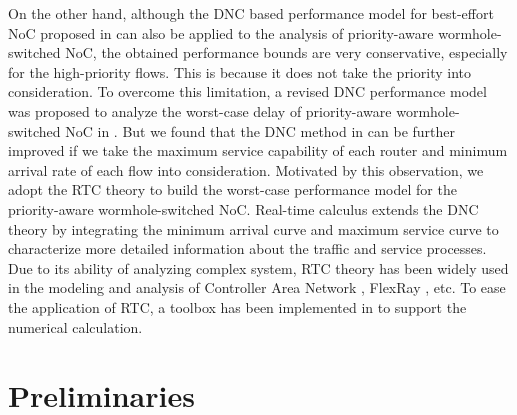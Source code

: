 \documentclass[preprint]{elsarticle}
\begin{document}
On the other hand, although the DNC based performance model for best-effort NoC proposed in \cite{qian2009analysis} can also be applied to the analysis of priority-aware wormhole-switched NoC, the obtained performance bounds are very conservative, especially for the high-priority flows. This is because it does not take the priority into consideration. To overcome this limitation, a revised DNC performance model was proposed to analyze the worst-case delay of priority-aware wormhole-switched NoC in \cite{Qian489900}. But we found that the DNC method in \cite{Qian489900} can be further improved if we take the maximum service capability of each router and minimum arrival rate of each flow into consideration. Motivated by this observation, we adopt the RTC theory \cite{1253607} to build the worst-case performance model for the priority-aware wormhole-switched NoC. Real-time calculus extends the DNC theory \cite{Boudec2001Network} by integrating the minimum arrival curve and maximum service curve to characterize more detailed information about the traffic and service processes. Due to its ability of analyzing complex system, RTC theory has been widely used in the modeling and analysis of Controller Area Network \cite{4617308}, FlexRay \cite{Hagiescu:2007:PAF:1278480.1278554}, etc. To ease the application of RTC, a toolbox has been implemented in \cite{rtc} to support the numerical calculation.

\section{Preliminaries}\label{model}
\end{document}
